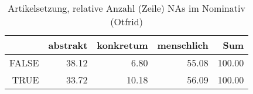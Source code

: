 \begin{table}[ht]
\centering
\begin{tabular}{rrrrr}
  \hline
 & abstrakt & konkretum & menschlich & Sum \\ 
  \hline
FALSE & 38.12 & 6.80 & 55.08 & 100.00 \\ 
  TRUE & 33.72 & 10.18 & 56.09 & 100.00 \\ 
   \hline
\end{tabular}
\caption{Artikelsetzung, relative Anzahl (Zeile) NAs im Nominativ (Otfrid)} 
\end{table}
